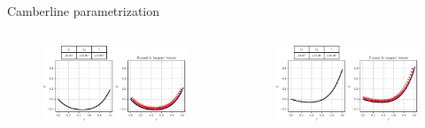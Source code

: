 \begin{frame}{Camberline parametrization}
    \vspace{-0.5cm}
    \begin{columns}
            \begin{figure}
                \centering
                \includegraphics[width=\textwidth]{./images/cLine1.eps}
            \end{figure}
            \begin{figure}
                \includegraphics[width=\textwidth]{./images/cLine2.eps}
            \end{figure}
    \end{columns}
\end{frame}   

